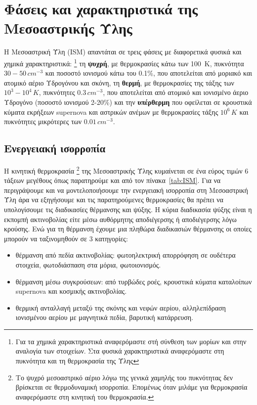 \documentclass[a4paper,11pt]{memoir}
\begin{document}
\section{Φάσεις και χαρακτηριστικά της Μεσοαστρικής Ύλης}
Η Μεσοαστρική Ύλη (ISM) απαντάται σε τρεις φάσεις με διαφορετικά φυσικά και χημικά χαρακτηριστικά: 
\footnote{Για τα χημικά χαρακτηριστικά αναφερόμαστε στή σύνθεση των μορίων και στην αναλογία των στοιχείων. Στα φυσικά χαρακτηριστικά αναφερόμαστε στη πυκνότητα και τη θερμοκρασία της Ύλης} 
τη \textbf{ψυχρή}, με θερμοκρασίες κάτω των \SI{100}{\kelvin}, πυκνότητα $30-50\, cm^{-3}$ και ποσοστό ιονισμού κάτω του 0.1\%, που αποτελείται από μοριακό και ατομικό αέριο Υδρογόνου και σκόνη, τη \textbf{θερμή}, με θερμοκρασίες της τάξης των $10^3-10^4\,K$, πυκνότητες $0.3\, cm^{-3}$, που αποτελείται από ατομικό και ιονισμένο άεριο Υδρογόνο (ποσοστό ιονισμού 2-20\%) και την \textbf{υπέρθερμη} που οφείλεται σε κρουστικά κύματα εκρήξεων supernova και αστρικών ανέμων με θερμοκρασίες τάξης $10^6 \,K$ και πυκνότητες μικρότερες των $0.01\, cm^{-3}$.


\subsection{Ενεργειακή ισορροπία}
\label{par:EnergyBalance}
Η κινητική θερμοκρασία \footnote{Το ψυχρό μεσοαστρικό αέριο λόγω της γενικά χαμηλής του πυκνότητας δεν βρίσκεται σε θερμοδυναμική ισορροπία. Επομένως όταν μιλάμε για θερμοκρασία αναφερόμαστε στη κινητική του θερμοκρασία.\cite[p. 28]{spitzer_1998}} της Μεσοαστρικής Ύλης κυμαίνεται σε ένα εύρος τιμών 6 τάξεων μεγέθους όπως παρατηρούμε και από τον πίνακα~\ref{tab:ISM}. Για να περιγράψουμε και να μοντελοποιήσουμε την ενεργειακή ισορροπία στη Μεσοαστρική Ύλη άρα να εξηγήσουμε και τις παρατηρούμενες θερμοκρασίες θα πρέπει να υπολογίσουμε τις διαδικασίες θέρμανσης και ψύξης. 
Η κύρια διαδικασία ψύξης είναι η εκπομπή ακτινοβολίας είτε μέσω αυθόρμητης αποδιέγερσης ή αποδιέγερσης λόγω κρούσης. Ενώ για τη θέρμανση έχουμε μια πληθώρα διαδικασιών θέρμανσης οι οποίες μπορούν να ταξινομηθούν σε 3 κατηγορίες:
\begin{itemize}
	\item θέρμανση από πεδία ακτινοβολίας: φωτοηλεκτρική απορρόφηση σε ουδέτερα στοιχεία, φωτοδιάσπαση στα μόρια, φωτοιονισμός.
	\item θέρμανση μέσω συγκρούσεων: από τυρβώδες ροές, κρουστικά κύματα καταλοίπων supernova και κοσμικής ακτινοβολίας.
	\item θερμική ανταλλαγή μεταξύ της σκόνης και νεφών αερίου, αλληλεπίδραση ιονισμένου αερίου με μαγνητικά πεδία, βαρυτική κατάρρευση. 
\end{itemize}
\end{document}
